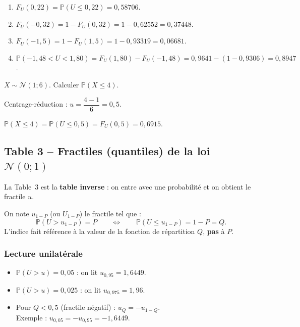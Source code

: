 \documentclass[11pt,a4paper]{article}
\newcommand{\N}{\mathcal{N}}
\newcommand{\Prob}{\mathbb{P}}
\renewcommand{\P}{\Prob}
\begin{document}
\begin{exbox}
\begin{enumerate}
\item $F_U(0{,}22) = \P(U \leq 0{,}22) = 0{,}58706$.
\item $F_U(-0{,}32) = 1 - F_U(0{,}32) = 1 - 0{,}62552 = 0{,}37448$.
\item $F_U(-1{,}5) = 1 - F_U(1{,}5) = 1 - 0{,}93319 = 0{,}06681$.
\item $\P(-1{,}48 < U < 1{,}80) = F_U(1{,}80) - F_U(-1{,}48) = 0{,}9641 - (1 - 0{,}9306) = 0{,}8947$.
\end{enumerate}
\end{exbox}

\begin{exbox}
$X \sim \N(1;6)$. Calculer $\P(X \leq 4)$.

Centrage-r\'eduction : $u = \dfrac{4-1}{6} = 0{,}5$.

$\P(X \leq 4) = \P\!\left(U \leq 0{,}5\right) = F_U(0{,}5) = 0{,}6915.$
\end{exbox}

\subsection{Table 3 -- Fractiles (quantiles) de la loi $\N(0;1)$}

La Table~3 est la \textbf{table inverse} : on entre avec une probabilit\'e et on obtient le fractile $u$.

\begin{defbox}
On note $u_{1-P}$ (ou $U_{1-P}$) le fractile tel que :
$$\P(U > u_{1-P}) = P \qquad\Longleftrightarrow\qquad \P(U \leq u_{1-P}) = 1-P = Q.$$
L'indice fait r\'ef\'erence \`a la valeur de la fonction de r\'epartition $Q$, \textbf{pas} \`a $P$.
\end{defbox}

\subsubsection{Lecture unilatérale}

\begin{exbox}[Exemples]
\begin{itemize}
\item $\P(U > u) = 0{,}05$ : on lit $u_{0{,}95} = 1{,}6449$.
\item $\P(U > u) = 0{,}025$ : on lit $u_{0{,}975} = 1{,}96$.
\item Pour $Q < 0{,}5$ (fractile n\'egatif) : $u_Q = -u_{1-Q}$.\\ Exemple : $u_{0{,}05} = -u_{0{,}95} = -1{,}6449$.
\end{itemize}
\end{exbox}
\end{document}
